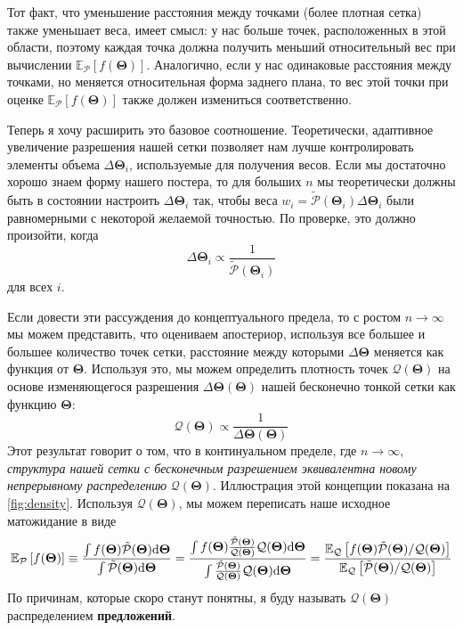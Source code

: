\documentclass[12pt, titlepage]{article}
\newcommand{\deriv}{\ensuremath{{\rm d}}}  %
\newcommand{\meanwrt}[2]{\ensuremath{\mathbb{E}_{{#2}}\left[{#1}\right]}}
\newcommand{\params}{\ensuremath{\boldsymbol\Theta}}
\newcommand{\posterior}{\ensuremath{\mathcal{P}}}
\newcommand{\proposal}{\ensuremath{\mathcal{Q}}}
\begin{document}
Тот факт, что уменьшение расстояния между точками (более плотная сетка) также уменьшает веса, имеет смысл: у нас больше точек, расположенных в этой области, поэтому каждая точка должна получить меньший относительный вес при вычислении $\meanwrt{f(\params)}{\posterior}$. Аналогично, если у нас одинаковые расстояния между точками, но меняется относительная форма заднего плана, то вес этой точки при оценке $\meanwrt{f(\params)}{\posterior}$ также должен измениться соответственно.

Теперь я хочу расширить это базовое соотношение. Теоретически, адаптивное увеличение разрешения нашей сетки позволяет нам лучше контролировать элементы объема $\Delta \params_i$, используемые для получения весов. Если мы достаточно хорошо знаем форму нашего постера, то для больших $n$ мы теоретически должны быть в состоянии настроить $\Delta \params_i$ так, чтобы веса $w_i = \tilde{\posterior}(\params_i)\Delta\params_i$ были равномерными с некоторой желаемой точностью. По проверке, это должно произойти, когда
\begin{equation}
    \Delta \params_i \propto \frac{1}{\tilde{\posterior}(\params_i)}
\end{equation}
для всех $i$.

Если довести эти рассуждения до концептуального предела, то с ростом $n \rightarrow \infty$ мы можем представить, что оцениваем апостериор, используя все большее и большее количество точек сетки, расстояние между которыми $\Delta \params$ меняется как функция от $\params$. Используя это, мы можем определить плотность точек $\proposal(\params)$ на основе изменяющегося разрешения $\Delta\params(\params)$ нашей бесконечно тонкой сетки как функцию $\params$: 
\begin{equation} 
	\proposal(\params)\propto \frac{1}{\Delta\params (\params)} 
\end{equation} 
Этот результат говорит о том, что в континуальном пределе, где $n \rightarrow \infty$, \textit{структура нашей сетки с бесконечным разрешением эквивалентна новому непрерывному распределению} $\proposal(\params)$. Иллюстрация этой концепции показана на {\color{red} \autoref{fig:density}}. Используя $\proposal(\params)$, мы можем переписать наше исходное матожидание в виде
\begin{equation}
    \meanwrt{f(\params)}{\posterior} 
    \equiv \frac{\int f(\params) \tilde{\posterior}(\params) \deriv \params}
    {\int \tilde{\posterior}(\params) \deriv \params}
    = \frac{\int f(\params) \frac{\tilde{\posterior}(\params)}{\proposal(\params)}
    \proposal(\params) \deriv \params}
    {\int \frac{\tilde{\posterior}(\params)}{\proposal(\params)}
    \proposal(\params) \deriv \params}
    = \frac{\meanwrt{f(\params) 
    \tilde{\posterior}(\params)/\proposal(\params)}{\proposal}}
    {\meanwrt{\tilde{\posterior}(\params)/\proposal(\params)}{\proposal}}
\end{equation}
По причинам, которые скоро станут понятны, я буду называть $\proposal(\params)$ распределением \textbf{предложений}.
\end{document}

